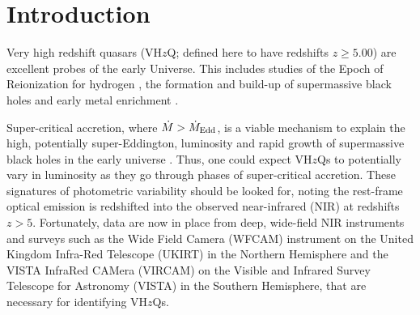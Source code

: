 \documentclass[usenatbib]{mnras}
\begin{document}
\section{Introduction}
Very high redshift quasars (VH$z$Q; defined here to have redshifts
$z\geq5.00$) are excellent probes of the early Universe. This includes
studies of the Epoch of Reionization for hydrogen \citep[see e.g.][for
reviews]{Fan2006review, Mortlock2016}, the formation and build-up of
supermassive black holes \citep[e.g., ][]{Rees1984, WyitheLoeb2003,
Volonteri2010, Agarwal2016, Valiante2018, Latif2018, Wise2019} and
early metal enrichment \citep[see e.g., ][]{Simcoe2012, Chen2017,
Bosman2017}.

Super-critical accretion, where $\dot{M} > \dot{M}_{\rm Edd}$, is a
viable mechanism to explain the high, potentially super-Eddington,
luminosity and rapid growth of supermassive black holes in the early
universe \citep[e.g.,][]{AlexanderNatarajan2014, MadauHaardtDotti2014,
Volonteri2015, Pezzulli2016, Lupi2016, Pezzulli2017, Takeo2018}. Thus,
one could expect VH$z$Qs to potentially vary in luminosity as they go
through phases of super-critical accretion. These signatures of
photometric variability should be looked for, noting the rest-frame
optical emission is redshifted into the observed near-infrared (NIR)
at redshifts $z>5$. Fortunately, data are now in place from deep,
wide-field NIR instruments and surveys such as the Wide Field Camera
(WFCAM) instrument on the United Kingdom Infra-Red Telescope (UKIRT)
in the Northern Hemisphere and the VISTA InfraRed CAMera (VIRCAM) on
the Visible and Infrared Survey Telescope for Astronomy (VISTA) in the
Southern Hemisphere, that are necessary for identifying VH$z$Qs.
\end{document}
